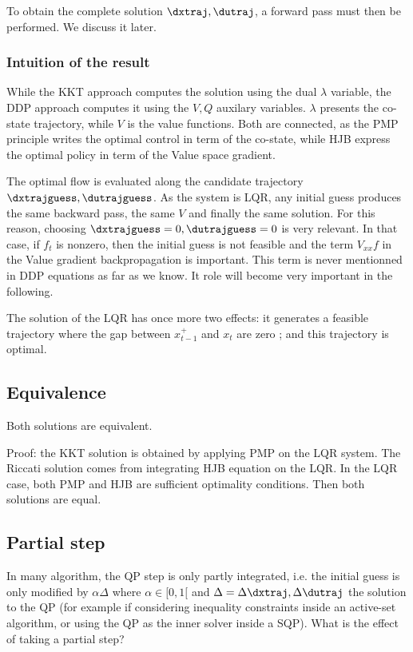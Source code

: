 \documentclass[10pt,a4paper]{article}
\begin{document}
To obtain the complete solution $\dxtraj,\dutraj$, a forward pass must then be performed.
We discuss it later.

\subsubsection{Intuition of the result}

While the KKT approach computes the solution using the dual $\lambda$ variable, the DDP approach computes it using the $V, Q$ auxilary variables.
$\lambda$ presents the co-state trajectory, while $V$ is the value functions.
Both are connected, as the PMP principle writes the optimal control in term of the co-state, while HJB express the optimal policy in term of the Value space gradient.

The optimal flow is evaluated along the candidate trajectory $\dxtrajguess,\dutrajguess$.
As the system is LQR, any initial guess produces the same backward pass, the same $V$ and finally the same solution.
For this reason, choosing $\dxtrajguess=0, \dutrajguess=0$ is very relevant.
In that case, if $f_t$ is nonzero, then the initial guess is not feasible and the term $V_{xx} f$ in the Value gradient backpropagation is important.
This term is never mentionned in DDP equations as far as we know.
It role will become very important in the following.

The solution of the LQR has once more two effects: it generates a feasible trajectory where the gap between $x_{t-1}^+$ and $x_t$ are zero ; and this trajectory is optimal.

\subsection{Equivalence}

Both solutions are equivalent.

Proof: the KKT solution is obtained by applying PMP on the LQR system. The Riccati solution comes from integrating HJB equation on the LQR. In the LQR case, both PMP and HJB are sufficient optimality conditions. Then both solutions are equal.

\subsection{Partial step}

In many algorithm, the QP step is only partly integrated, i.e. the initial guess is only modified by $\alpha \Delta$ where $\alpha \in [0,1[$ and $\Delta = \Delta \dxtraj,\Delta \dutraj$ the solution to the QP (for example if considering inequality constraints inside an active-set algorithm, or using the QP as the inner solver inside a SQP).
What is the effect of taking a partial step?
\end{document}

